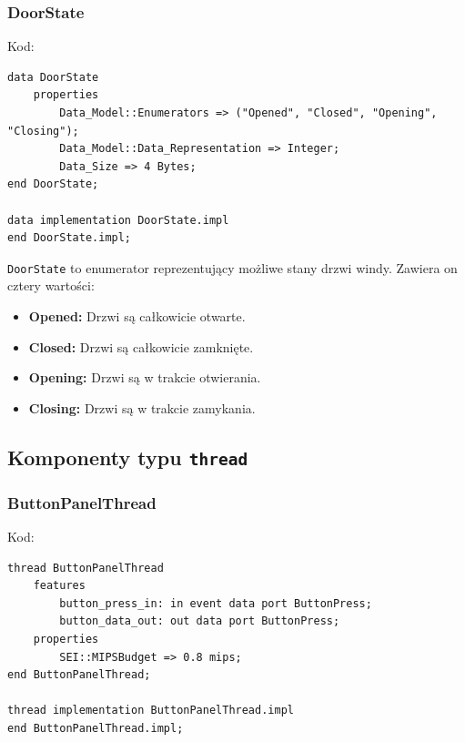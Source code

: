\documentclass{article}
\begin{document}
    \subsubsection{DoorState}

    Kod:
    
    \begin{lstlisting}[basicstyle=\ttfamily, keywordstyle=\bfseries]
data DoorState
    properties
        Data_Model::Enumerators => ("Opened", "Closed", "Opening", "Closing");
        Data_Model::Data_Representation => Integer;
        Data_Size => 4 Bytes;
end DoorState;

data implementation DoorState.impl
end DoorState.impl;
    \end{lstlisting}

    \texttt{DoorState} to enumerator reprezentujący możliwe stany drzwi windy. Zawiera on cztery wartości:

    \begin{itemize}
        \item \textbf{Opened:} Drzwi są całkowicie otwarte.
        \item \textbf{Closed:} Drzwi są całkowicie zamknięte.
        \item \textbf{Opening:} Drzwi są w trakcie otwierania.
        \item \textbf{Closing:} Drzwi są w trakcie zamykania.
    \end{itemize}



    \subsection{Komponenty typu \texttt{thread}}

    
    \subsubsection{ButtonPanelThread}

    Kod:
    
    \begin{lstlisting}[basicstyle=\ttfamily, keywordstyle=\bfseries]
thread ButtonPanelThread
    features
        button_press_in: in event data port ButtonPress;
        button_data_out: out data port ButtonPress;
    properties
        SEI::MIPSBudget => 0.8 mips;
end ButtonPanelThread;

thread implementation ButtonPanelThread.impl
end ButtonPanelThread.impl;
    \end{lstlisting}
\end{document}
